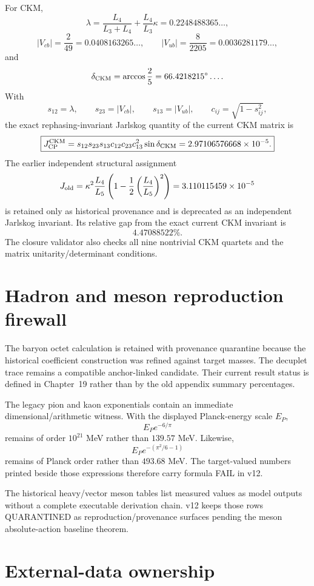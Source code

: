 For CKM,
\[
\lambda
=\frac{L_4}{L_3+L_4}
+\frac{L_4}{L_3}\kappa
=0.2248488365\ldots,
\]
\[
|V_{cb}|=\frac2{49}=0.0408163265\ldots,
\qquad
|V_{ub}|=\frac8{2205}=0.0036281179\ldots,
\]
and
\[
\delta_{\rm CKM}=\arccos\frac25=66.4218215^\circ\ldots .
\]
With
\[
s_{12}=\lambda,\qquad s_{23}=|V_{cb}|,\qquad s_{13}=|V_{ub}|,
\qquad c_{ij}=\sqrt{1-s_{ij}^2},
\]
the exact rephasing-invariant Jarlskog quantity of the current CKM matrix is
\[
\boxed{
J_{\rm CP}^{\rm CKM}
=s_{12}s_{23}s_{13}c_{12}c_{23}c_{13}^2\sin\delta_{\rm CKM}
=2.97106576668\times10^{-5}.
}
\]
The earlier independent structural assignment
\[
J_{\rm old}
=\kappa^2\frac{L_4}{L_5}
\left(1-\frac12\left(\frac{L_4}{L_5}\right)^2\right)
=3.110115459\times10^{-5}
\]
is retained only as historical provenance and is deprecated as an independent
Jarlskog invariant.  Its relative gap from the exact current CKM invariant is
\[
4.47088522\%.
\]
The closure validator also checks all nine nontrivial CKM quartets and the
matrix unitarity/determinant conditions.

\section{Hadron and meson reproduction firewall}

The baryon octet calculation is retained with provenance quarantine because
the historical coefficient construction was refined against target masses.
The decuplet trace remains a compatible anchor-linked candidate.  Their
current result status is defined in Chapter~19 rather than by the old appendix
summary percentages.

The legacy pion and kaon exponentials contain an immediate dimensional/arithmetic
witness.  With the displayed Planck-energy scale \(E_P\),
\[
E_Pe^{-6/\pi}
\]
remains of order \(10^{21}\) MeV rather than \(139.57\) MeV.  Likewise,
\[
E_Pe^{-(\pi^2/6-1)}
\]
remains of Planck order rather than \(493.68\) MeV.  The target-valued numbers
printed beside those expressions therefore carry formula FAIL in v12.

The historical heavy/vector meson tables list measured values as model outputs
without a complete executable derivation chain.  v12 keeps those rows
QUARANTINED as reproduction/provenance surfaces pending the meson absolute-action
baseline theorem.

\section{External-data ownership}

